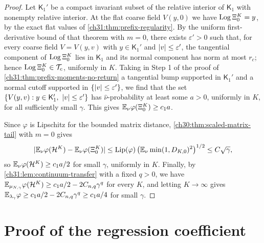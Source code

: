 \begin{proof}
Let $\mathsf K_1'$ be a compact invariant subset of the relative interior of $\mathsf K_1$ with nonempty relative interior. At the flat coarse field $V(y,0)$ we have $\operatorname{Log}\Xi_0^K=y$, by the exact flat values of \cref{ch31:thm:prefix-regularity}. By the uniform first-derivative bound of that theorem with $m=0$, there exists $\varepsilon'>0$ such that, for every coarse field $V=V(y,v)$ with $y\in\mathsf K_1'$ and $\lvert v\rvert\le\varepsilon'$, the tangential component of $\operatorname{Log}\Xi_0^K$ lies in $\mathsf K_1$ and its normal component has norm at most $r_c$; hence $\operatorname{Log}\Xi_0^K\in\mathcal T_c$, uniformly in $K$. Taking in Step 1 of the proof of \cref{ch31:thm:prefix-moments-no-return} a tangential bump supported in $\mathsf K_1'$ and a normal cutoff supported in $\{\lvert v\rvert\le\varepsilon'\}$, we find that the set $\{V(y,v):y\in\mathsf K_1',\ \lvert v\rvert\le\varepsilon'\}$ has $\widehat\nu$-probability at least some $a>0$, uniformly in $K$, for all sufficiently small $\gamma$. This gives $\mathbb E_\nu\varphi(\Xi_0^K)\ge c_1a$.

Since $\varphi$ is Lipschitz for the bounded matrix distance, \cref{ch30:thm:scaled-matrix-tail} with $m=0$ gives
\[
 \lvert \mathbb E_\nu\varphi(\mathcal H^K)-\mathbb E_\nu\varphi(\Xi_0^K)\rvert\le\operatorname{Lip}(\varphi)\,\bigl(\mathbb E_\nu\min(1,D_{K,0})^2\bigr)^{1/2}\le C\sqrt\gamma,
\]
so $\mathbb E_\nu\varphi(\mathcal H^K)\ge c_1a/2$ for small $\gamma$, uniformly in $K$. Finally, by \cref{ch31:lem:continuum-transfer} with a fixed $q>0$, we have $\mathbb E_{\mu_{N,\gamma}}\varphi(\mathcal H^K)\ge c_1a/2-2C_{n,q}\gamma^q$ for every $K$, and letting $K\to\infty$ gives $\mathbb E_{\lambda_\gamma}\varphi\ge c_1a/2-2C_{n,q}\gamma^q\ge c_1a/4$ for small $\gamma$.
\end{proof}

\section{Proof of the regression coefficient}\label{ch31:sec:proof-statistic}

